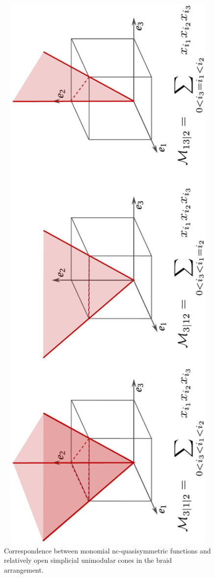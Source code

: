 \documentclass[12pt,reqno]{amsart}
\numberwithin{definition}{section}
\theoremstyle{definition}
\begin{document}
\begin{figure}[h]
\includegraphics[angle=270,width=14cm]{cone}
\caption{\label{fig:cone}Correspondence between monomial nc-quasisymmetric functions and relatively open simplicial unimodular cones in the braid arrangement.}
\end{figure}
\end{document}
